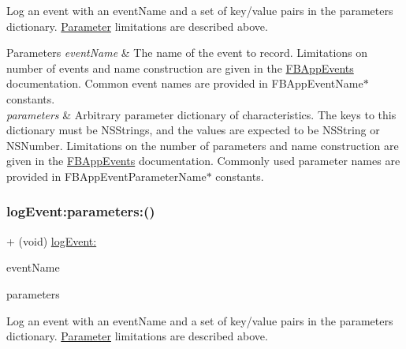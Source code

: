 Log an event with an event\+Name and a set of key/value pairs in the parameters dictionary. \hyperlink{structParameter}{Parameter} limitations are described above.


\begin{DoxyParams}{Parameters}
{\em event\+Name} & The name of the event to record. Limitations on number of events and name construction are given in the {\ttfamily \hyperlink{interfaceFBAppEvents}{F\+B\+App\+Events}} documentation. Common event names are provided in {\ttfamily F\+B\+App\+Event\+Name$\ast$} constants.\\
\hline
{\em parameters} & Arbitrary parameter dictionary of characteristics. The keys to this dictionary must be N\+S\+String\textquotesingle{}s, and the values are expected to be N\+S\+String or N\+S\+Number. Limitations on the number of parameters and name construction are given in the {\ttfamily \hyperlink{interfaceFBAppEvents}{F\+B\+App\+Events}} documentation. Commonly used parameter names are provided in {\ttfamily F\+B\+App\+Event\+Parameter\+Name$\ast$} constants. \\
\hline
\end{DoxyParams}
\mbox{\label{interfaceFBAppEvents_a68b55bf0f5695fdf0089326473fcf4ea}} 
\subsubsection{\texorpdfstring{log\+Event\+:parameters\+:()}{logEvent:parameters:()}\hspace{0.1cm}{\footnotesize\ttfamily [2/5]}}
{\footnotesize\ttfamily + (void) \hyperlink{interfaceFBAppEvents_a816373dd50bcf7381bf8194758ef8441}{log\+Event\+:} \begin{DoxyParamCaption}\item[{(N\+S\+String $\ast$)}]{event\+Name }\item[{parameters:(N\+S\+Dictionary $\ast$)}]{parameters }\end{DoxyParamCaption}}

Log an event with an event\+Name and a set of key/value pairs in the parameters dictionary. \hyperlink{structParameter}{Parameter} limitations are described above.


